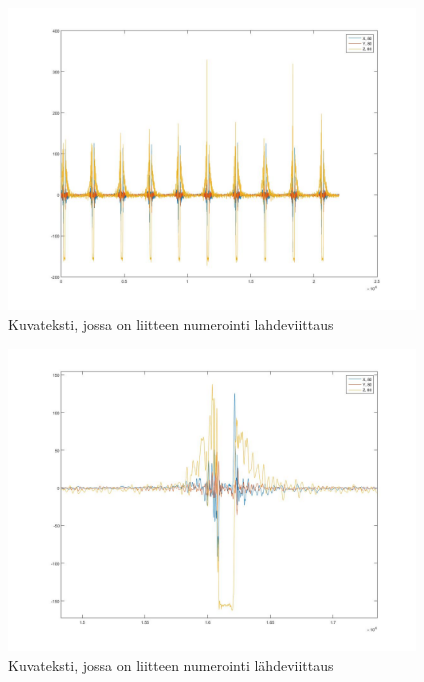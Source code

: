 \begin{figure}[htb]
\begin{center}
\includegraphics[height=8cm]{images/80kmh_timedomain}
\end{center}
\caption{Kuvateksti, jossa on liitteen numerointi {\color{red}lahdeviittaus}}
\label{liitekuva}
\end{figure}

\begin{figure}[htb]
\begin{center}
\includegraphics[height=8cm]{images/80kmh_timedomain_onerotation}
\end{center}
\caption{Kuvateksti, jossa on liitteen numerointi {\color{red}l\"ahdeviittaus}}
\label{liitekuva}
\end{figure}

